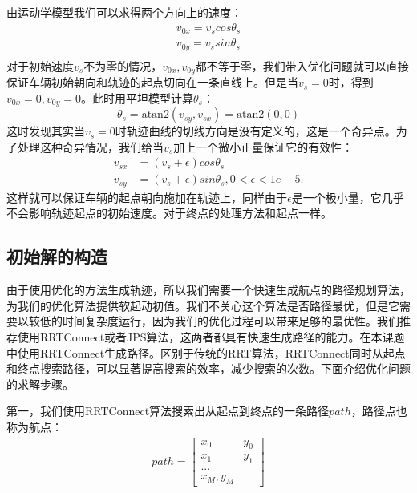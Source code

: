 \documentclass[master,academic]{ysuthesis} %
\begin{document}
		由运动学模型我们可以求得两个方向上的速度：
		\begin{equation}
			\begin{aligned}
				v_{0x}=v_scos\theta _s\\
				v_{0y}=v_ssin\theta _s\\
			\end{aligned}
		\end{equation}
		对于初始速度$v_s$不为零的情况，$v_{0x},v_{0y}$都不等于零，我们带入优化问题就可以直接保证车辆初始朝向和轨迹的起点切向在一条直线上。但是当$v_{s}=0$时，得到$v_{0x}=0,v_{0y}=0$。此时用平坦模型计算$\theta_s$：
		\begin{equation}
			\theta_s=\text{atan}2\left( v_{sy},v_{sx} \right) =\text{atan}2\left( 0,0 \right) 
		\end{equation}
		这时发现其实当$v_{s}=0$时轨迹曲线的切线方向是没有定义的，这是一个奇异点。为了处理这种奇异情况，我们给当$v_{s}$加上一个微小正量保证它的有效性：
		\begin{equation}
			\begin{aligned}
			v_{sx}&=\left( v_s+\epsilon \right) cos\theta_s\\
			v_{sy}&=\left( v_s+\epsilon \right) sin\theta_s,0<\epsilon <1e-5.
			\end{aligned}
		\end{equation}
		这样就可以保证车辆的起点朝向施加在轨迹上，同样由于$\epsilon$是一个极小量，它几乎不会影响轨迹起点的初始速度。对于终点的处理方法和起点一样。

		\subsection{初始解的构造}
		由于使用优化的方法生成轨迹，所以我们需要一个快速生成航点的路径规划算法，为我们的优化算法提供软起动初值。我们不关心这个算法是否路径最优，但是它需要以较低的时间复杂度运行，因为我们的优化过程可以带来足够的最优性。我们推荐使用RRTConnect或者JPS算法，这两者都具有快速生成路径的能力。在本课题中使用RRTConnect生成路径。区别于传统的RRT算法，RRTConnect同时从起点和终点搜索路径，可以显著提高搜索的效率，减少搜索的次数。下面介绍优化问题的求解步骤。
		
		第一，我们使用RRTConnect算法搜索出从起点到终点的一条路径$path$，路径点也称为航点：
		\begin{equation}
			\begin{aligned}
				path = \begin{bmatrix}
					x_0 &y_0\\
					x_1&y_1\\
					...\\
					x_M,y_M
				\end{bmatrix}
			\end{aligned}
		\end{equation}
\end{document}
